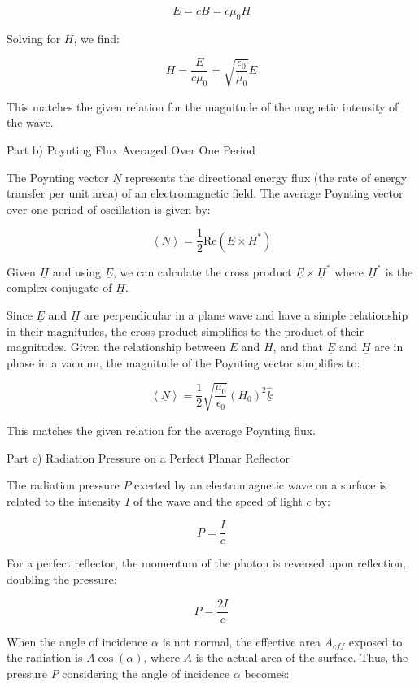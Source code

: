 \documentclass[a4paper,11pt]{article}
\begin{document}
\[
E = cB = c\mu_{0}H
\]

Solving for \(H\), we find:

\[
H = \frac{E}{c\mu_{0}} = \sqrt{\frac{\epsilon_{0}}{\mu_{0}}} E
\]

This matches the given relation for the magnitude of the magnetic intensity of the wave.

Part b) Poynting Flux Averaged Over One Period

The Poynting vector \(\underline{N}\) represents the directional energy flux (the rate of energy transfer per unit area) of an electromagnetic field. The average Poynting vector over one period of oscillation is given by:

\[
\left< \underline{N} \right> = \frac{1}{2} \text{Re}(\underline{E} \times \underline{H}^*)
\]

Given \(\underline{H}\) and using \(\underline{E}\), we can calculate the cross product \(\underline{E} \times \underline{H}^*\) where \(\underline{H}^*\) is the complex conjugate of \(\underline{H}\).

Since \(\underline{E}\) and \(\underline{H}\) are perpendicular in a plane wave and have a simple relationship in their magnitudes, the cross product simplifies to the product of their magnitudes. Given the relationship between \(E\) and \(H\), and that \(\underline{E}\) and \(\underline{H}\) are in phase in a vacuum, the magnitude of the Poynting vector simplifies to:

\[
\left< \underline{N} \right> = \frac{1}{2} \sqrt{\frac{\mu_{0}}{\epsilon_{0}}} (H_{0})^{2} \hat{\underline{k}}
\]

This matches the given relation for the average Poynting flux.

Part c) Radiation Pressure on a Perfect Planar Reflector

The radiation pressure \( P\) exerted by an electromagnetic wave on a surface is related to the intensity \(I\) of the wave and the speed of light \(c\) by:

\[
P = \frac{I}{c}
\]

For a perfect reflector, the momentum of the photon is reversed upon reflection, doubling the pressure:

\[
P = \frac{2I}{c}
\]

When the angle of incidence \(\alpha\) is not normal, the effective area \(A_{eff}\) exposed to the radiation is \(A\cos(\alpha)\), where \(A\) is the actual area of the surface. Thus, the pressure \(P\) considering the angle of incidence \(\alpha\) becomes:
\end{document}
